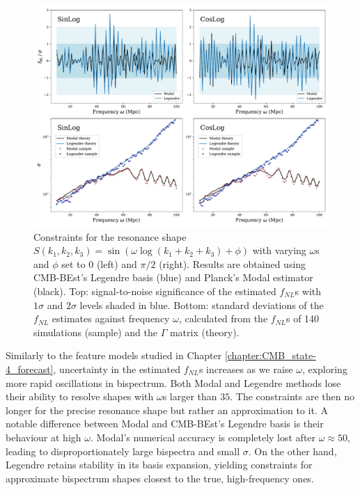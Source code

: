 \begin{figure}[htbp!] 
	\centering    
	\includegraphics[width=\textwidth]{sinlog_template_frequency_Legendre_Modal.pdf}
	\caption{Constraints for the resonance shape $S(k_1,k_2,k_3) = \sin(\omega \log(k_1 + k_2 + k_3 ) + \phi)$ with varying $\omega$s and $\phi$ set to $0$ (left) and $\pi/2$ (right). Results are obtained using CMB-BEst's Legendre basis (blue) and Planck's Modal estimator (black). Top: signal-to-noise significance of the estimated $f_{NL}$s with $1\sigma$ and $2\sigma$ levels shaded in blue. Bottom: standard deviations of the $f_{NL}$ estimates against frequency $\omega$, calculated from the $f_{NL}$s of 140 simulations (sample) and the $\Gamma$ matrix (theory).}
	\label{fig:sinlog_template_frequency_Legendre_Modal}
\end{figure}

Similarly to the feature models studied in Chapter \ref{chapter:CMB_state-4_forecast}, uncertainty in the estimated $f_{NL}$s increases as we raise $\omega$, exploring more rapid oscillations in bispectrum. Both Modal and Legendre methods lose their ability to resolve shapes with $\omega$s larger than $35$. The constraints are then no longer for the precise resonance shape but rather an approximation to it. A notable difference between Modal and CMB-BEst's Legendre basis is their behaviour at high $\omega$. Modal's numerical accuracy is completely lost after $\omega\approx 50$, leading to disproportionately large bispectra and small $\sigma$. On the other hand, Legendre retains stability in its basis expansion, yielding constraints for approximate bispectrum shapes closest to the true, high-frequency ones.

